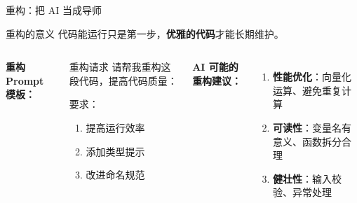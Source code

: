 
\begin{frame}{重构：把 AI 当成导师}
	\begin{block}{重构的意义}
		代码能运行只是第一步，\textbf{优雅的代码}才能长期维护。
	\end{block}

	\vspace{0.3cm}

	\begin{columns}
		\textbf{重构 Prompt 模板：}

		\begin{exampleblock}{重构请求}
			请帮我重构这段代码，提高代码质量：

			要求：
			\begin{enumerate}
				\item 提高运行效率
				\item 添加类型提示
				\item 改进命名规范
			\end{enumerate}
		\end{exampleblock}

		\textbf{AI 可能的重构建议：}

		\begin{enumerate}
			\item \textbf{性能优化}：向量化运算、避免重复计算
			\item \textbf{可读性}：变量名有意义、函数拆分合理
			\item \textbf{健壮性}：输入校验、异常处理
		\end{enumerate}
	\end{columns}
\end{frame}


